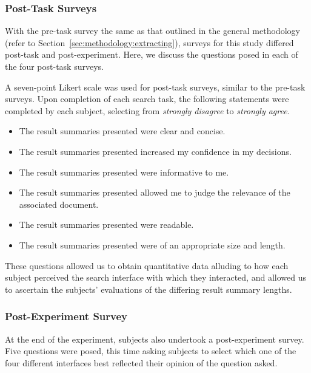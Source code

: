 \subsubsection{Post-Task Surveys}\label{sec:snippets:method:posttask}
With the pre-task survey the same as that outlined in the general methodology (refer to Section~\ref{sec:methodology:extracting}), surveys for this study differed post-task and post-experiment. Here, we discuss the questions posed in each of the four post-task surveys.

A seven-point Likert scale was used for post-task surveys, similar to the pre-task surveys. Upon completion of each search task, the following statements were completed by each subject, selecting from \emph{strongly disagree} to \emph{strongly agree.}

\begin{itemize}
    \item{ The result summaries presented were clear and concise.}
    \item{ The result summaries presented increased my confidence in my decisions.}
    \item{ The result summaries presented were informative to me.}
    \item{ The result summaries presented allowed me to judge the relevance of the associated document.}
    \item{ The result summaries presented were readable.}
    \item{ The result summaries presented were of an appropriate size and length.}
\end{itemize}

These questions allowed us to obtain quantitative data alluding to how each subject perceived the search interface with which they interacted, and allowed us to ascertain the subjects' evaluations of the differing result summary lengths.

\subsubsection{Post-Experiment Survey}\label{sec:snippets:method:postexperiment}
At the end of the experiment, subjects also undertook a post-experiment survey. Five questions were posed, this time asking subjects to select which one of the four different interfaces best reflected their opinion of the question asked.

